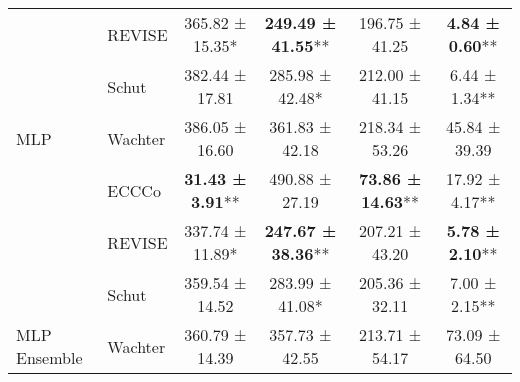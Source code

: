 \begin{table}
{\begin{tabular}[t]{llcccc}
 & REVISE & 365.82 ± 15.35*\hphantom{*} & \textbf{249.49 ± 41.55}** & 196.75 ± 41.25\hphantom{*}\hphantom{*} & \textbf{4.84 ± 0.60}**\\

 & Schut & 382.44 ± 17.81\hphantom{*}\hphantom{*} & 285.98 ± 42.48*\hphantom{*} & 212.00 ± 41.15\hphantom{*}\hphantom{*} & 6.44 ± 1.34**\\

\multirow{-4}{*}{\raggedright\arraybackslash MLP} & Wachter & 386.05 ± 16.60\hphantom{*}\hphantom{*} & 361.83 ± 42.18\hphantom{*}\hphantom{*} & 218.34 ± 53.26\hphantom{*}\hphantom{*} & 45.84 ± 39.39\hphantom{*}\hphantom{*}\\
\cmidrule{1-6}
 & ECCCo & \textbf{31.43 ± 3.91}** & 490.88 ± 27.19\hphantom{*}\hphantom{*} & \textbf{73.86 ± 14.63}** & 17.92 ± 4.17**\\

 & REVISE & 337.74 ± 11.89*\hphantom{*} & \textbf{247.67 ± 38.36}** & 207.21 ± 43.20\hphantom{*}\hphantom{*} & \textbf{5.78 ± 2.10}**\\

 & Schut & 359.54 ± 14.52\hphantom{*}\hphantom{*} & 283.99 ± 41.08*\hphantom{*} & 205.36 ± 32.11\hphantom{*}\hphantom{*} & 7.00 ± 2.15**\\

\multirow{-4}{*}{\raggedright\arraybackslash MLP Ensemble} & Wachter & 360.79 ± 14.39\hphantom{*}\hphantom{*} & 357.73 ± 42.55\hphantom{*}\hphantom{*} & 213.71 ± 54.17\hphantom{*}\hphantom{*} & 73.09 ± 64.50\hphantom{*}\hphantom{*}\\
\bottomrule
\end{tabular}}
\end{table}
